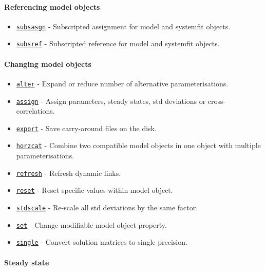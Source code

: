 \paragraph{Referencing model objects}\label{referencing-model-objects}

\begin{itemize}
\itemsep1pt\parskip0pt
\item
  \href{model/subsasgn}{\texttt{subsasgn}} - Subscripted assignment for
  model and systemfit objects.
\item
  \href{model/subsref}{\texttt{subsref}} - Subscripted reference for
  model and systemfit objects.
\end{itemize}

\paragraph{Changing model objects}\label{changing-model-objects}

\begin{itemize}
\itemsep1pt\parskip0pt
\item
  \href{model/alter}{\texttt{alter}} - Expand or reduce number of
  alternative parameterisations.
\item
  \href{model/assign}{\texttt{assign}} - Assign parameters, steady
  states, std deviations or cross-correlations.
\item
  \href{model/export}{\texttt{export}} - Save carry-around files on the
  disk.
\item
  \href{model/horzcat}{\texttt{horzcat}} - Combine two compatible model
  objects in one object with multiple parameterisations.
\item
  \href{model/refresh}{\texttt{refresh}} - Refresh dynamic links.
\item
  \href{model/reset}{\texttt{reset}} - Reset specific values within
  model object.
\item
  \href{model/stdscale}{\texttt{stdscale}} - Re-scale all std deviations
  by the same factor.
\item
  \href{model/set}{\texttt{set}} - Change modifiable model object
  property.
\item
  \href{model/single}{\texttt{single}} - Convert solution matrices to
  single precision.
\end{itemize}

\paragraph{Steady state}\label{steady-state}

